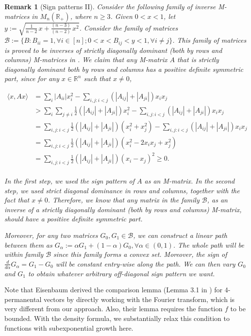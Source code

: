 \documentclass[a4paper, 11pt]{article}
\newtheorem{rem}{Remark}[thm]
\begin{document}
\vspace{.3em} \begin{rem}[Sign patterns II]
Consider the following family of inverse M-matrices in $M_n(\mathbb{R}_+)$, where $n\geq 3$. Given $0<x<1$, let $y:=\sqrt{\frac{1}{n-2}\,x+\frac{(n-3)}{(n-2)}\,x^2}$. Consider the family of matrices $\mathcal{B}:=\{B: B_{ii}=1,\forall i\in [n]; 0<x<B_{ij}<y<1, \forall i\neq j\}$. This family of matrices is proved to be inverses of strictly diagonally dominant (both by rows and columns) M-matrices in \cite[Theorem 2]{will77}. We claim that any M-matrix $A$ that is strictly diagonally dominant both by rows and columns has a positive definite symmetric part, since for any $x\in\mathbb{R}^n$ such that $x\neq 0$,

\begin{align*}
\langle x,Ax\rangle
&= \sum_{i}|A_{ii}|x_i^2-\sum_{i,j:i<j}(|A_{ij}|+|A_{ji}|)x_ix_j \\
&> \sum_{i}\sum_{j\neq i}\frac{1}{2}(|A_{ij}|+|A_{ji}|)x_i^2-\sum_{i,j:i<j}(|A_{ij}|+|A_{ji}|)x_ix_j\\
&= \sum_{i,j:i<j}\frac{1}{2}(|A_{ij}|+|A_{ji}|)(x_i^2+x_j^2)-\sum_{i,j:i<j}(|A_{ij}|+|A_{ji}|)x_ix_j\\
&= \sum_{i,j:i<j}\frac{1}{2}(|A_{ij}|+|A_{ji}|)(x_i^2-2x_ix_j+x_j^2)\\
&= \sum_{i,j:i<j}\frac{1}{2}(|A_{ij}|+|A_{ji}|)(x_i-x_j)^2\geq 0.\\
\end{align*}

In the first step, we used the sign pattern of $A$ as an M-matrix. In the second step, we used strict diagonal dominance in rows and columns, together with the fact that $x\neq 0$. Therefore, we know that any matrix in the family $\mathcal{B}$, as an inverse of a strictly diagonally dominant (both by rows and columns) M-matrix, should have a positive definite symmetric part.

Moreover, for any two matrices $G_0, G_1\in\mathcal{B}$, we can construct a linear path between them as $G_\alpha:=\alpha G_1+(1-\alpha)G_0, \forall \alpha\in(0,1)$. The whole path will be within family $\mathcal{B}$ since this family forms a convex set. Moreover, the sign of $\frac{d}{d\alpha}G_\alpha=G_1-G_0$ will be constant entry-wise along the path. We can then vary $G_0$ and $G_1$ to obtain
whatever arbitrary off-diagonal sign pattern we want.
\end{rem}

Note that Eisenbaum derived the comparison lemma (Lemma 3.1 in \cite{eisenbaum13}) for 4-permanental vectors by directly working with the Fourier transform, which is very different from our approach. Also, their lemma requires the function $f$ to be bounded. With the density formula, we substantially relax this condition to functions with subexponential growth here.
\end{document}
